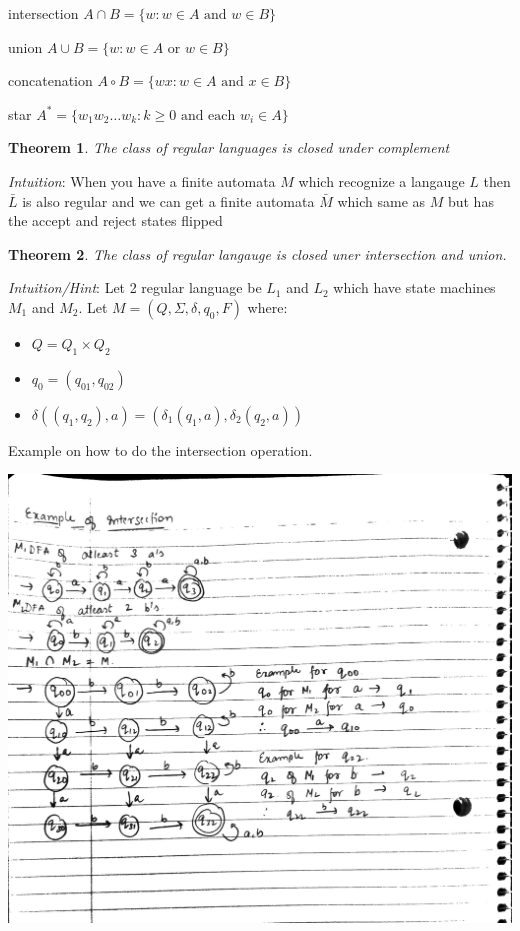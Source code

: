 \documentclass[oneside, 12pt]{book}
\newtheorem{theorem}{Theorem}
\begin{document}
intersection $A\cap B = \{w: w\in A \text{ and } w\in B\}$

union $A\cup B = \{w: w\in A \text{ or } w\in B\}$

concatenation $A\circ B = \{wx: w\in A \text{ and } x\in B\}$

star $A^{*}=\{w_{1}w_{2}\dots w_{k}: k\ge 0 \text{ and each } w_{i} \in A \}$



\begin{theorem}
  The class of regular languages is closed under complement
\end{theorem}

\emph{Intuition}: When you have a finite automata $M$ which recognize a langauge $L$ then $\bar{L}$ is also regular and we can get a finite automata $\bar{M}$ which same as $M$ but has the accept and reject states flipped

\begin{theorem}
  The class of regular langauge is closed uner intersection and union.
\end{theorem}

\emph{Intuition/Hint}: Let 2 regular language be $L_{1}$ and $L_{2}$ which have state machines $M_{1}$ and $M_{2}$. Let $M=(Q,\Sigma, \delta, q_{0}, F)$ where:

\begin{itemize}
  \item $Q=Q_{1}\times Q_{2}$
  \item $q_{0} = (q_{01}, q_{02})$
  \item $\delta((q_{1}, q_{2}), a) = (\delta_{1}(q_{1}, a), \delta_{2}(q_{2}, a))$
\end{itemize}

Example on how to do the intersection operation.

\includegraphics[width=\textwidth]{intersection}
\end{document}
